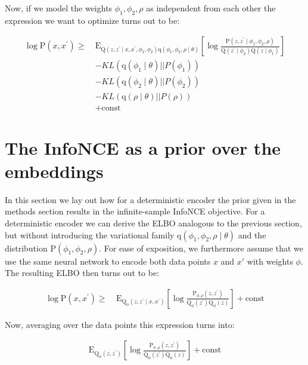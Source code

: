 \documentclass[tablecaption=bottom,wcp]{jmlr} %
\begin{document}
Now, if we model the weights $\phi_{1},\phi_{2},\rho$ as independent from each other the expression we want to optimize turns out to be: 

\begin{align}
 \log\mathrm{P}\left(x, x^{\prime}\right) \geq \
  &\mathrm{E}_{\mathrm{Q}\left(z, z^{\prime}\mid x,x^{\prime},\phi_{1},\phi_{2} \right)\mathrm{q}(\phi_{1},\phi_{2},\rho  \mid \theta)}\left[\log\frac{\mathrm{P}\left(z,z^{\prime}\mid \phi_{1},\phi_{2}, \rho \right)}{\mathrm{Q}\left(z^{\prime}\mid \phi_{2}\right)\mathrm{Q}\left(z \mid \phi_{1}\right)} \right] \\
 & - KL(\mathrm{q}(\phi_{1}\mid \theta)||P(\phi_{1}))  \\
 & -KL(\mathrm{q}(\phi_{2} \mid \theta)||P(\phi_{2})) \\
 & - KL(\mathrm{q}(\rho \mid \theta)||P(\rho)) \\
 & + \text{const}
\end{align}

\newpage
\section{The InfoNCE as a prior over the embeddings}\label{apd:InfoNCE_ELBO}

In this section we lay out how for a deterministic encoder the prior given in the methods section results in the infinite-sample InfoNCE objective. For a deterministic encoder we can derive the ELBO analogous to the previous section, but without introducing the variational family $\mathrm{q}(\phi_{1},\phi_{2},\rho  \mid \theta)$ and the distribution $\mathrm{P}\left( \phi_{1},\phi_{2}, \rho \right)$. For ease of exposition, we furthermore assume that we use the same neural network to encode both data points $x$ and $x'$ with weights $\phi$. The resulting ELBO then turns out to be:

\begin{align}
 \log\mathrm{P}\left(x, x^{\prime}\right) \geq \
  &\mathrm{E}_{\mathrm{Q}_{\phi}\left(z, z^{\prime}\mid x,x^{\prime}\right)}\left[\log\frac{\mathrm{P}_{\phi,\rho}\left(z,z^{\prime}\right)}{\mathrm{Q}_{\phi}\left(z^{\prime}\right)\mathrm{Q}_{\phi}\left(z \right)} \right] + \text{const}
\end{align}

Now, averaging over the data points this expression turns into:

\begin{align}
  \mathrm{E}_{\mathrm{Q}_{\phi}\left(z, z^{\prime}\right)}\left[\log\frac{\mathrm{P}_{\phi,\rho}\left(z,z^{\prime}\right)}{\mathrm{Q}_{\phi}\left(z^{\prime}\right)\mathrm{Q}_{\phi}\left(z \right)} \right] + \text{const}
\end{align}
\end{document}
